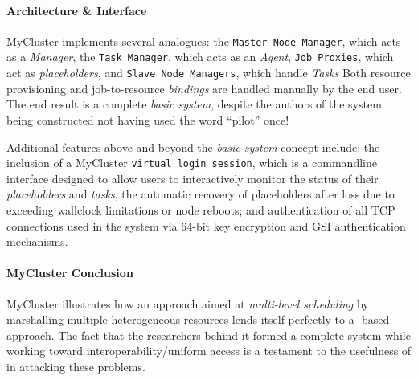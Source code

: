 \documentclass{sig-alternate}
\begin{document}
\paragraph{Architecture \& Interface}
MyCluster implements several \pilotjob analogues: the \texttt{Master
  Node Manager}, which acts as a \textit{\pilotjob Manager}, the
\texttt{Task Manager}, which acts as an \textit{\pilotjob Agent},
\texttt{Job Proxies}, which act as \textit{placeholders}, and
\texttt{Slave Node Managers}, which handle \textit{\pilotjob Tasks}
Both resource provisioning and job-to-resource \textit{bindings}
are handled manually by the end user.
The end result is a complete \textit{basic \pilotjob system}, despite the
authors of the system being constructed not having used the word ``pilot''
once!~\cite{1652061}

Additional features above and beyond the \textit{basic \pilotjob system}
concept include: the inclusion of a MyCluster
\texttt{virtual login session}, which
is a commandline interface designed to allow users to interactively
monitor the status of their \textit{placeholders} and \textit{tasks},
the automatic recovery of placeholders after loss due to exceeding wallclock
limitations or node reboots; and authentication of all TCP
connections used in the system via 64-bit key encryption and
GSI authentication mechanisms.

\paragraph{MyCluster Conclusion}
MyCluster illustrates how an approach aimed at \textit{multi-level
scheduling} by marshalling multiple heterogeneous resources lends
itself perfectly to a \pilotjob-based approach.  The fact that
the researchers behind it formed a complete \pilotjob system
while working toward interoperability/uniform access is a testament
to the usefulness of \pilotjobs in attacking these problems.



\end{document}
